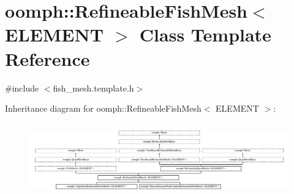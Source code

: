 \hypertarget{classoomph_1_1RefineableFishMesh}{}\section{oomph\+:\+:Refineable\+Fish\+Mesh$<$ E\+L\+E\+M\+E\+NT $>$ Class Template Reference}
\label{classoomph_1_1RefineableFishMesh}


{\ttfamily \#include $<$fish\+\_\+mesh.\+template.\+h$>$}

Inheritance diagram for oomph\+:\+:Refineable\+Fish\+Mesh$<$ E\+L\+E\+M\+E\+NT $>$\+:\begin{figure}[H]
\begin{center}
\leavevmode
\includegraphics[height=3.186992cm]{classoomph_1_1RefineableFishMesh}
\end{center}
\end{figure}
